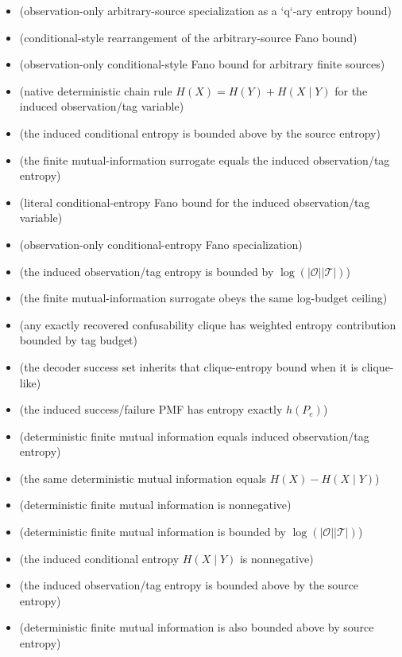 \begin{itemize}
\item {} (observation-only arbitrary-source specialization as a `q`-ary entropy bound)
\item {} (conditional-style rearrangement of the arbitrary-source Fano bound)
\item {} (observation-only conditional-style Fano bound for arbitrary finite sources)
\item {} (native deterministic chain rule $H(X)=H(Y)+H(X\mid Y)$ for the induced observation/tag variable)
\item {} (the induced conditional entropy is bounded above by the source entropy)
\item {} (the finite mutual-information surrogate equals the induced observation/tag entropy)
\item {} (literal conditional-entropy Fano bound for the induced observation/tag variable)
\item {} (observation-only conditional-entropy Fano specialization)
\item {} (the induced observation/tag entropy is bounded by $\log(|\mathcal O||\mathcal T|)$)
\item {} (the finite mutual-information surrogate obeys the same log-budget ceiling)
\item {} (any exactly recovered confusability clique has weighted entropy contribution bounded by tag budget)
\item {} (the decoder success set inherits that clique-entropy bound when it is clique-like)
\item {} (the induced success/failure PMF has entropy exactly $h(P_e)$)
\item {} (deterministic finite mutual information equals induced observation/tag entropy)
\item {} (the same deterministic mutual information equals $H(X)-H(X\mid Y)$)
\item {} (deterministic finite mutual information is nonnegative)
\item {} (deterministic finite mutual information is bounded by $\log(|\mathcal O||\mathcal T|)$)
\item {} (the induced conditional entropy $H(X\mid Y)$ is nonnegative)
\item {} (the induced observation/tag entropy is bounded above by the source entropy)
\item {} (deterministic finite mutual information is also bounded above by source entropy)

\end{itemize}
